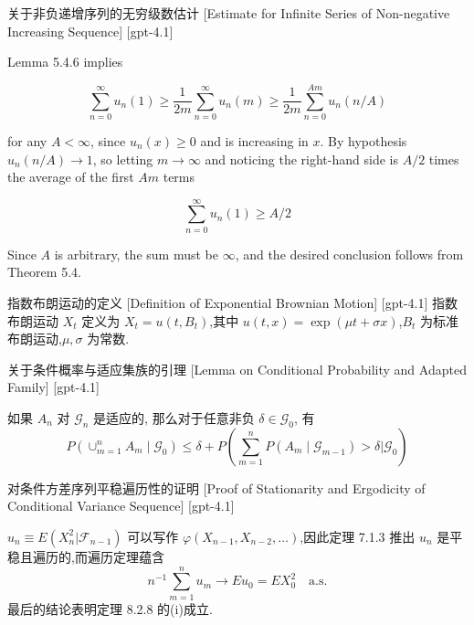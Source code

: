 \documentclass[UTF8]{ctexart}
\begin{document}
    
    
    \begin{lma}
        {关于非负递增序列的无穷级数估计}
        [Estimate for Infinite Series of Non-negative Increasing Sequence]
        [gpt-4.1]
        
Lemma 5.4.6 implies

\[
\sum_{n=0}^\infty u_n(1) \geq \frac{1}{2m} \sum_{n=0}^\infty u_n(m) \geq \frac{1}{2m} \sum_{n=0}^{A m} u_n(n / A)
\]

for any $A < \infty$, since $u_n(x) \geq 0$ and is increasing in $x$. By hypothesis $u_n(n / A) \to 1$, so letting $m \to \infty$ and noticing the right-hand side is $A/2$ times the average of the first $A m$ terms

\[
\sum_{n=0}^\infty u_n(1) \geq A/2
\]

Since $A$ is arbitrary, the sum must be $\infty$, and the desired conclusion follows from Theorem 5.4.

    \end{lma}
    
    
    
    \begin{dfn}
        {指数布朗运动的定义}
        [Definition of Exponential Brownian Motion]
        [gpt-4.1]
        指数布朗运动 $X_{t}$ 定义为 $X_{t} = u(t, B_{t})$,其中 $u(t, x) = \exp(\mu t + \sigma x)$,$B_t$ 为标准布朗运动,$\mu, \sigma$ 为常数.
    \end{dfn}
    
    
    
    \begin{lma}
        {关于条件概率与适应集族的引理}
        [Lemma on Conditional Probability and Adapted Family]
        [gpt-4.1]
        
如果 $A_n$ 对 ${\mathcal{G}}_n$ 是适应的, 那么对于任意非负 $\delta \in \mathcal{G}_0$, 有
\[
P\left( \cup_{m=1}^n A_m \mid \mathcal{G}_0 \right) \leq \delta + P\left( \sum_{m=1}^n P(A_m \mid \mathcal{G}_{m-1}) > \delta \Bigg| \mathcal{G}_0 \right)
\]

    \end{lma}
    
    
    
    \begin{prf}
        {对条件方差序列平稳遍历性的证明}
        [Proof of Stationarity and Ergodicity of Conditional Variance Sequence]
        [gpt-4.1]
        
$u_{n} \equiv E ( X_{n}^{2} | \mathcal{F}_{n-1} )$ 可以写作 $\varphi ( X_{n-1}, X_{n-2}, \ldots )$,因此定理 7.1.3 推出 $u_{n}$ 是平稳且遍历的,而遍历定理蕴含
\[
n^{-1} \sum_{m=1}^{n} u_{m} \to E u_{0} = E X_{0}^{2} \quad \mathrm{a.s.}
\]
最后的结论表明定理 8.2.8 的(i)成立.

    \end{prf}
    
\end{document}
